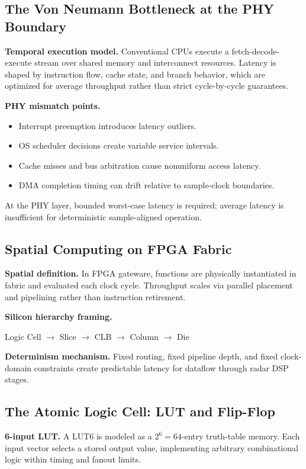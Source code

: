 \documentclass[11pt]{article}
\begin{document}
\subsection{The Von Neumann Bottleneck at the PHY Boundary}
\textbf{Temporal execution model.}
Conventional CPUs execute a fetch-decode-execute stream over shared memory and interconnect resources. Latency is shaped by instruction flow, cache state, and branch behavior, which are optimized for average throughput rather than strict cycle-by-cycle guarantees.

\textbf{PHY mismatch points.}
\begin{itemize}
  \item Interrupt preemption introduces latency outliers.
  \item OS scheduler decisions create variable service intervals.
  \item Cache misses and bus arbitration cause nonuniform access latency.
  \item DMA completion timing can drift relative to sample-clock boundaries.
\end{itemize}
At the PHY layer, bounded worst-case latency is required; average latency is insufficient for deterministic sample-aligned operation.

\subsection{Spatial Computing on FPGA Fabric}
\textbf{Spatial definition.}
In FPGA gateware, functions are physically instantiated in fabric and evaluated each clock cycle. Throughput scales via parallel placement and pipelining rather than instruction retirement.

\textbf{Silicon hierarchy framing.}
\begin{center}
Logic Cell \(\rightarrow\) Slice \(\rightarrow\) CLB \(\rightarrow\) Column \(\rightarrow\) Die
\end{center}

\textbf{Determinism mechanism.}
Fixed routing, fixed pipeline depth, and fixed clock-domain constraints create predictable latency for \AXIStream dataflow through radar DSP stages.

\subsection{The Atomic Logic Cell: LUT and Flip-Flop}
\textbf{6-input LUT.}
A LUT6 is modeled as a \(2^6=64\)-entry truth-table memory. Each input vector selects a stored output value, implementing arbitrary combinational logic within timing and fanout limits.
\end{document}
